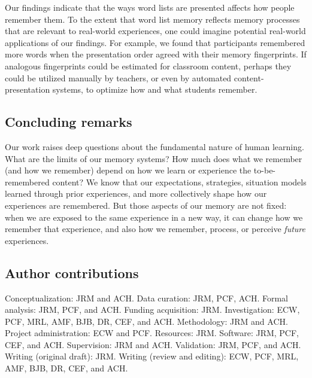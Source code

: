 \documentclass[11pt]{article}
\begin{document}
Our findings indicate that the ways word lists are presented affects how people
remember them. To the extent that word list memory reflects memory processes
that are relevant to real-world experiences, one could imagine potential
real-world applications of our findings. For example, we found that
participants remembered more words when the presentation order agreed with
their memory fingerprints. If analogous fingerprints could be estimated for
classroom content, perhaps they could be utilized manually by teachers, or even
by automated content-presentation systems, to optimize how and what students
remember.



\subsection*{Concluding remarks}

Our work raises deep questions about the fundamental nature of human learning.
What are the limits of our memory systems? How much does what we remember (and
how we remember) depend on how we learn or experience the to-be-remembered
content? We know that our expectations, strategies, situation models learned
through prior experiences, and more collectively shape how our experiences are
remembered. But those aspects of our memory are not fixed: when we are exposed
to the same experience in a new way, it can change how we remember
that experience, and also how we remember, process, or perceive
\textit{future} experiences.

\subsection*{Author contributions}

Conceptualization: JRM and ACH. Data curation: JRM, PCF, ACH. Formal analysis:
JRM, PCF, and ACH. Funding acquisition: JRM. Investigation: ECW, PCF, MRL, AMF,
BJB, DR, CEF, and ACH. Methodology: JRM and ACH. Project administration: ECW
and PCF. Resources: JRM. Software: JRM, PCF, CEF, and ACH. Supervision: JRM and
ACH. Validation: JRM, PCF, and ACH. Writing (original draft): JRM. Writing
(review and editing): ECW, PCF, MRL, AMF, BJB, DR, CEF, and ACH.
\end{document}
